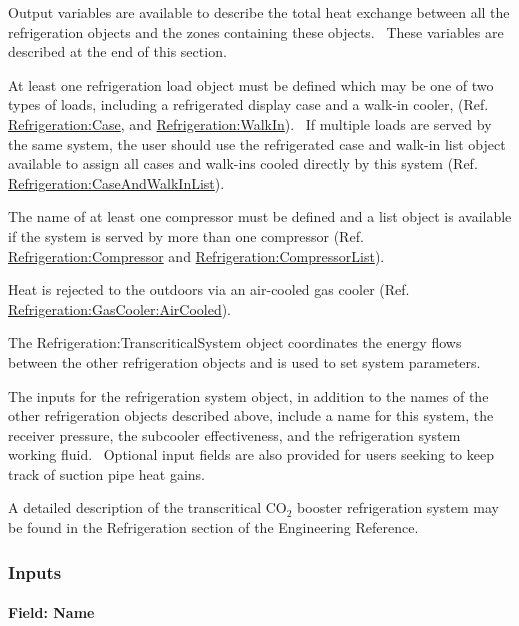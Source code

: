 Output variables are available to describe the total heat exchange between all the refrigeration objects and the zones containing these objects.~ These variables are described at the end of this section.

At least one refrigeration load object must be defined which may be one of two types of loads, including a refrigerated display case and a walk-in cooler, (Ref. \hyperref[refrigerationcase]{Refrigeration:Case}, and \hyperref[refrigerationwalkin]{Refrigeration:WalkIn}).~ If multiple loads are served by the same system, the user should use the refrigerated case and walk-in list object available to assign all cases and walk-ins cooled directly by this system (Ref. \hyperref[refrigerationcaseandwalkinlist]{Refrigeration:CaseAndWalkInList}).

The name of at least one compressor must be defined and a list object is available if the system is served by more than one compressor (Ref. \hyperref[refrigerationcompressor]{Refrigeration:Compressor} and \hyperref[refrigerationcompressorlist]{Refrigeration:CompressorList}).

Heat is rejected to the outdoors via an air-cooled gas cooler (Ref. \hyperref[refrigerationgascooleraircooled]{Refrigeration:GasCooler:AirCooled}).

The Refrigeration:TranscriticalSystem object coordinates the energy flows between the other refrigeration objects and is used to set system parameters.

The inputs for the refrigeration system object, in addition to the names of the other refrigeration objects described above, include a name for this system, the receiver pressure, the subcooler effectiveness, and the refrigeration system working fluid.~ Optional input fields are also provided for users seeking to keep track of suction pipe heat gains.

A detailed description of the transcritical CO\(_{2}\) booster refrigeration system may be found in the Refrigeration section of the Engineering Reference.

\subsubsection{Inputs}\label{inputs-4-026}

\paragraph{Field: Name}\label{field-name-5-019}

